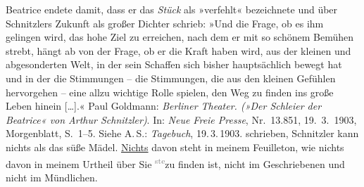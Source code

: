 {{{{                     Beatrice} endete damit, dass er das \emph{Stück} als »verfehlt« bezeichnete und über Schnitzlers Zukunft als großer Dichter schrieb: »Und die Frage, ob es ihm
                        gelingen wird, das hohe Ziel zu erreichen, nach dem er mit so schönem
                        Bemühen strebt, hängt ab von der Frage, ob er die Kraft haben wird, aus der
                        kleinen und abgesonderten Welt, in der sein Schaffen sich bisher
                        hauptsächlich bewegt hat und in der die Stimmungen – die Stimmungen, die aus
                        den kleinen Gefühlen hervorgehen – eine allzu wichtige Rolle spielen, den
                        Weg zu finden ins große Leben hinein […].« Paul Goldmann: \emph{Berliner Theater. (»Der Schleier der Beatrice« von Arthur
                        Schnitzler)}. In: \emph{Neue Freie
                        Presse}, Nr. 13.851, 19. 3. 1903,
                     Morgenblatt, S. 1–5. Siehe A. S.: \emph{Tagebuch}, 19. 3. 1903.}}}\label{K_L03353-5} schrieben, Schnitzler kann nichts als das süße Mädel.
                  \uline{Nichts} davon steht in meinem Feuilleton, wie nichts davon in meinem
               Urtheil über Sie \substVorne{}\textsuperscript{\textcolor{gray}{ste}}\substDazwischen{}zu\substHinten{} finden ist, nicht im Geschriebenen und nicht im Mündlichen.\pend
           
